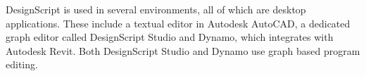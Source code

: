 DesignScript is used in several environments, all of which are desktop applications.
These include a textual editor in Autodesk AutoCAD, a dedicated graph editor called DesignScript Studio and Dynamo, which integrates with Autodesk Revit.
Both DesignScript Studio and Dynamo use graph based program editing.






